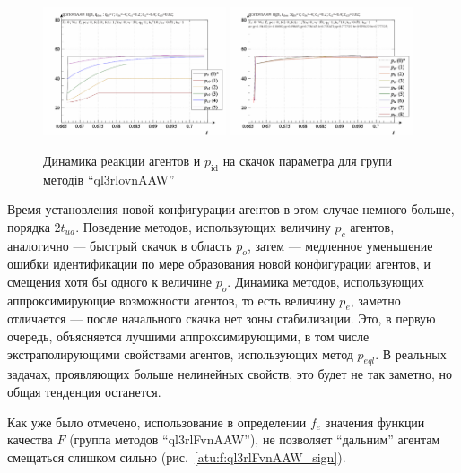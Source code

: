 \begin{figure}[htb!]
  \begin{center}
    \includegraphics[width=0.48\textwidth]{p/sign/qls-p_t_pi_m_ql3rlovnAAW_sign.png}
    \hfill
    \includegraphics[width=0.48\textwidth]{p/sign/qls-p_t_p_m_ql3rlovnAAW_sign.png}
  \end{center}
  \caption{Динамика реакции агентов и $p_\mathrm{id}$ на скачок параметра для групи методів ``ql3rlovnAAW''}
  \label{atu:f:ql3rlovnAAW_sign}
\end{figure}

Время установления новой конфигурации агентов в этом случае немного больше, порядка
$2 t_{ua}$. Поведение методов, использующих величину $p_c$ агентов,
аналогично --- быстрый скачок в область $p_o$, затем --- медленное
уменьшение ошибки идентификации по мере образования новой конфигурации агентов,
и смещения хотя бы одного к величине $p_o$.
Динамика методов, использующих аппроксимирующие возможности агентов,
то есть величину $p_e$, заметно отличается --- после начального скачка
нет зоны стабилизации. Это, в первую очередь, объясняется лучшими аппроксимирующими,
в том числе экстраполирующими свойствами агентов, использующих метод $p_{eql}$.
В реальных задачах, проявляющих больше нелинейных свойств, это будет не так заметно,
но общая тенденция останется.

Как уже было отмечено, использование в определении $f_e$
значения функции качества $F$ (группа методов ``ql3rlFvnAAW''),
не позволяет ``дальним'' агентам смещаться слишком сильно
(рис.~\ref{atu:f:ql3rlFvnAAW_sign}).

